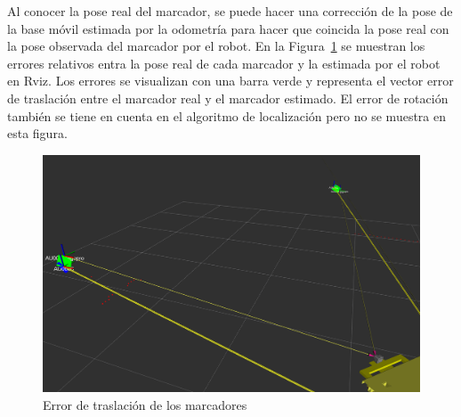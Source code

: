 \documentclass[12pt, a4paper]{report}
\begin{document}
			Al conocer la pose real del marcador, se puede hacer una corrección de la pose de la base móvil estimada por la odometría para hacer que coincida la pose real con la pose observada del marcador por el robot.
			En la Figura~\ref{fig:cv_errores} se muestran los errores relativos entra la pose real de cada marcador y la estimada por el robot en Rviz.
			Los errores se visualizan con una barra verde y representa el vector error de traslación entre el marcador real y el marcador estimado.
			El error de rotación también se tiene en cuenta en el algoritmo de localización pero no se muestra en esta figura.
			\begin{figure}[H]
				\centering
				\includegraphics[width=0.9\linewidth]{img/cv_errores}
				\caption{Error de traslación de los marcadores}
				\label{fig:cv_errores}
			\end{figure}
\end{document}
